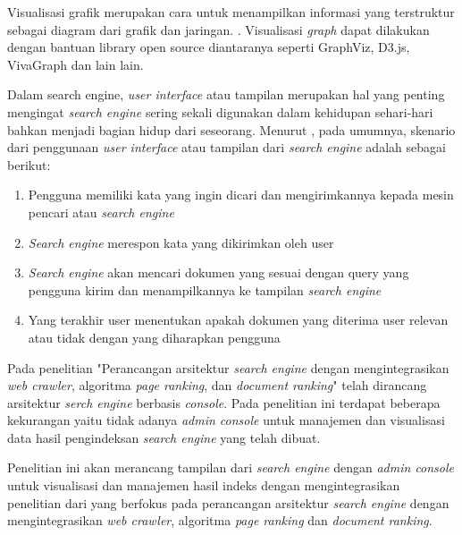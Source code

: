 Visualisasi grafik merupakan cara untuk menampilkan informasi yang terstruktur sebagai diagram dari grafik dan jaringan. \citep{graphvisualizationmeaning}. Visualisasi \textit{graph} dapat dilakukan dengan bantuan library open source diantaranya seperti GraphViz, D3.js, VivaGraph dan lain lain.\citep{graphyifanhu}

Dalam search engine, \textit{user interface} atau tampilan merupakan hal yang penting mengingat \textit{search engine} sering sekali digunakan dalam kehidupan sehari-hari bahkan menjadi bagian hidup dari seseorang. Menurut \citep{alonsoumarbaezaricardo}, pada umumnya, skenario dari penggunaan \textit{user interface} atau tampilan dari \textit{search engine} adalah sebagai berikut: 

\begin{enumerate}
	\item Pengguna memiliki kata yang ingin dicari dan mengirimkannya kepada mesin pencari atau \textit{search engine}
	\item  \textit{Search engine} merespon kata yang dikirimkan oleh user
	\item \textit{Search engine} akan mencari dokumen yang sesuai dengan query yang pengguna kirim dan menampilkannya ke tampilan \textit{search engine}
	\item Yang terakhir user menentukan apakah dokumen yang diterima user relevan atau tidak dengan yang diharapkan pengguna
\end{enumerate}


Pada penelitian "Perancangan arsitektur \textit{search engine} dengan mengintegrasikan \textit{web crawler}, algoritma \textit{page ranking}, dan \textit{document ranking}" \citep{lazu} telah dirancang arsitektur \textit{serch engine} berbasis \textit{console}. Pada penelitian ini terdapat beberapa kekurangan yaitu tidak adanya \textit{admin console} untuk manajemen dan visualisasi data hasil pengindeksan \textit{search engine} yang telah dibuat.

Penelitian ini akan merancang tampilan dari \textit{search engine} dengan \textit{admin console} untuk visualisasi dan manajemen hasil indeks dengan mengintegrasikan penelitian dari \cite{lazu} yang berfokus pada perancangan arsitektur \textit{search engine} dengan mengintegrasikan \textit{web crawler}, algoritma \textit{page ranking} dan \textit{document ranking}.

